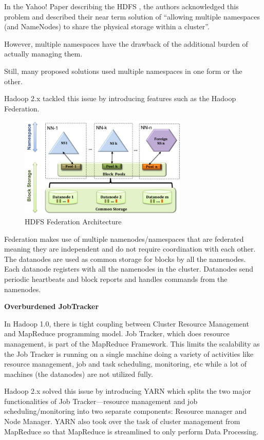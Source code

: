 \documentclass[conference]{IEEEtran}
\begin{document}
In the Yahoo! Paper describing the HDFS \cite{Shvachko2010b}, the authors acknowledged this problem and described their near term 
solution of “allowing multiple namespaces (and NameNodes) to share the physical storage within a cluster”.

However, multiple namespaces have the drawback of the additional burden of actually managing them. 

Still, many proposed solutions used multiple namespaces in one form or the other. \cite{Singh2012}

Hadoop 2.x tackled this issue by introducing features such as the Hadoop Federation.

\begin{figure}[h!]
        \centering
        \includegraphics[width=80mm]{HDFS_Federation}
        \caption{HDFS Federation Architecture}
\end{figure}

Federation makes use of multiple namenodes/namespaces that are federated meaning they are independent and do not 
require coordination with each other. The datanodes are used as common storage for blocks by all the namenodes. 
Each datanode registers with all the namenodes in the cluster. Datanodes send periodic heartbeats and block reports 
and handles commands from the namenodes.\cite{Suresh2011}

\textbf{Overburdened JobTracker}

In Hadoop 1.0, there is tight coupling between Cluster Resource Management and MapReduce programming model. 
Job Tracker, which does resource management, is part of the MapReduce Framework. 
This limits the scalability as the Job Tracker is running on a single machine doing a variety of activities like 
resource management, job and task scheduling, monitoring, etc while a lot of machines (the datanodes) are not utilized fully.

Hadoop 2.x solved this issue by introducing YARN which splits the two major functionalities of Job Tracker—resource 
management and job scheduling/monitoring into two separate components: Resource manager and Node Manager. 
YARN also took over the task of cluster management from MapReduce so that MapReduce is streamlined to only perform Data Processing.
\end{document}
